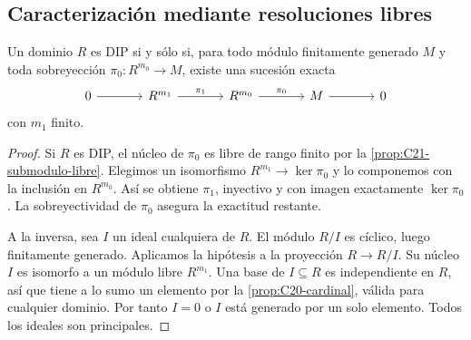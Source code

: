 \subsection{Caracterización mediante resoluciones libres}\label{tema:21-1-3}
\begin{prop}\label{prop:C21-resoluciones}
Un dominio $R$ es DIP si y sólo si, para todo módulo finitamente generado $M$ y toda sobreyección $\pi_0:R^{m_0}\to M$, existe una sucesión exacta
\[
\begin{tikzcd}[column sep=large]
0\arrow[r]&R^{m_1}\arrow[r,"\pi_1"]&R^{m_0}\arrow[r,"\pi_0"]&M\arrow[r]&0
\end{tikzcd}
\]
con $m_1$ finito.
\end{prop}
\begin{proof}
Si $R$ es DIP, el núcleo de $\pi_0$ es libre de rango finito por la \cref{prop:C21-submodulo-libre}. Elegimos un isomorfismo $R^{m_1}\to\ker\pi_0$ y lo componemos con la inclusión en $R^{m_0}$. Así se obtiene $\pi_1$, inyectivo y con imagen exactamente $\ker\pi_0$. La sobreyectividad de $\pi_0$ asegura la exactitud restante.

A la inversa, sea $I$ un ideal cualquiera de $R$. El módulo $R/I$ es cíclico, luego finitamente generado. Aplicamos la hipótesis a la proyección $R\to R/I$. Su núcleo $I$ es isomorfo a un módulo libre $R^{m_1}$. Una base de $I\subseteq R$ es independiente en $R$, así que tiene a lo sumo un elemento por la \cref{prop:C20-cardinal}, válida para cualquier dominio. Por tanto $I=0$ o $I$ está generado por un solo elemento. Todos los ideales son principales.
\end{proof}
